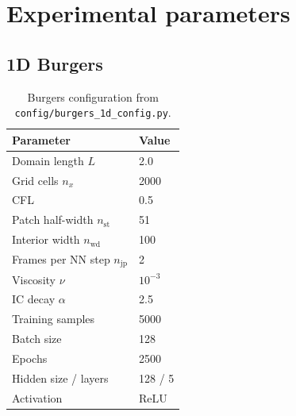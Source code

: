 ﻿\documentclass[11pt,a4paper]{article}
\begin{document}
\section{Experimental parameters}

\subsection{1D Burgers}
\begin{table}[H]
  \centering
  \caption{Burgers configuration from \texttt{config/burgers\_1d\_config.py}.}
  \begin{tabular}{ll}
    \toprule
    Parameter & Value \\
    \midrule
    Domain length $L$ & 2.0 \\
    Grid cells $n_x$ & 2000 \\
    CFL & 0.5 \\
    Patch half-width $n_{\mathrm{st}}$ & 51 \\
    Interior width $n_{\mathrm{wd}}$ & 100 \\
    Frames per NN step $n_{\mathrm{jp}}$ & 2 \\
    Viscosity $\nu$ & $10^{-3}$ \\
    IC decay $\alpha$ & 2.5 \\
    Training samples & 5000 \\
    Batch size & 128 \\
    Epochs & 2500 \\
    Hidden size / layers & 128 / 5 \\
    Activation & ReLU \\
    \bottomrule
  \end{tabular}
\end{table}
\end{document}
